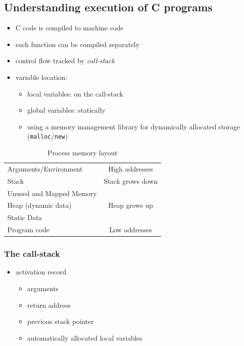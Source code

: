 \documentclass[12pt,titlepage,a4paper]{report}
\begin{document}
	\subsection{Understanding execution of C programs}
	\begin{itemize}
		\item C code is compiled to machine code
		\item each function can be compiled separately
		\item control flow tracked by \emph{call-stack}
		\item variable location:
		\begin{itemize}
			\item local variables: on the call-stack
			\item global variables: statically
			\item using a memory management library for dynamically allocated storage (\texttt{malloc}/\texttt{new})
		\end{itemize}
	\end{itemize}
	\begin{table}[h!]
		\centering
		\begin{tabular}{| l | c}
			\cline{1-1}
			Arguments/Environment & High addresses \\ \cline{1-1}
			Stack & Stack grows down \\ \cline{1-1}
			\cellcolor{gray}Unused and Mapped Memory & \\ \cline{1-1}
			Heap (dynamic data) & Heap grows up \\ \cline{1-1}
			Static Data & \\ \cline{1-1}
			Program code & Low addresses \\ \cline{1-1}
		\end{tabular}
		\caption{Process memory layout}
	\end{table}

	\subsubsection{The call-stack}
	\begin{itemize}
		\item activation record
		\begin{itemize}
			\item arguments
			\item return address
			\item previous stack pointer
			\item automatically allocated local variables
		\end{itemize}
	\end{itemize}
	
\end{document}
